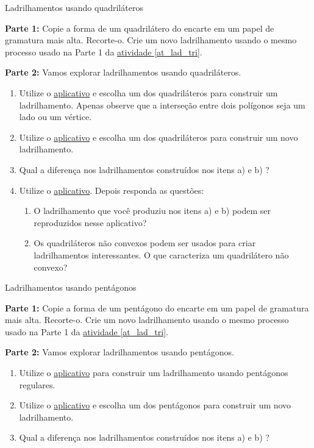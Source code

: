 \begin{task}{Ladrilhamentos usando quadriláteros} \label{lad_qua}

\textbf{Parte 1:} Copie a forma de um quadrilátero do encarte em um papel de gramatura mais alta. Recorte-o. Crie um novo ladrilhamento usando o mesmo processo usado na Parte 1 da \hyperref[at_lad_tri]{atividade \ref{at_lad_tri}}. 

\textbf{Parte 2:} Vamos explorar  ladrilhamentos  usando quadriláteros. 
\begin{enumerate}

\item Utilize o \href{https://www.geogebra.org/m/d6nvffqk}{aplicativo} e escolha um dos quadriláteros para construir um ladrilhamento. Apenas observe que a interseção entre dois polígonos seja um lado ou um vértice.
\item Utilize o \href{https://www.geogebra.org/m/mdybnpnq}{aplicativo} e escolha um dos quadriláteros para construir um novo ladrilhamento.
\item Qual a diferença nos ladrilhamentos construídos nos itens a) e b) ?
\item Utilize o \href{https://www.geogebra.org/m/uqemfkhp#material/bhuqetbc}{aplicativo}. Depois responda as questões:
\begin{enumerate}
\item O ladrilhamento que você produziu nos itens a) e b) podem ser reproduzidos nesse aplicativo?
\item Os quadriláteros não convexos podem ser usados para criar ladrilhamentos interessantes. O que caracteriza um quadrilátero não convexo?
\end{enumerate}

\end{enumerate}

\end{task}


\begin{task}{Ladrilhamentos usando pentágonos}\label{lad_pen}

\textbf{Parte 1:} Copie a forma de  um pentágono do encarte em um papel de gramatura mais alta. Recorte-o. Crie um novo ladrilhamento usando o mesmo processo usado na Parte 1 da \hyperref[at_lad_tri]{atividade \ref{at_lad_tri}}. 

\textbf{Parte 2:} Vamos explorar  ladrilhamentos  usando pentágonos. 
\begin{enumerate}

\item Utilize o \href{https://www.geogebra.org/m/exzjd4mh}{aplicativo} para construir um ladrilhamento usando pentágonos regulares.
\item Utilize o  \href{https://www.geogebra.org/m/sffzzsww}{aplicativo}  e escolha um dos pentágonos para construir um novo ladrilhamento.
\item Qual a diferença nos ladrilhamentos construídos nos itens a) e b) ?
\end{enumerate}
\end{task}

